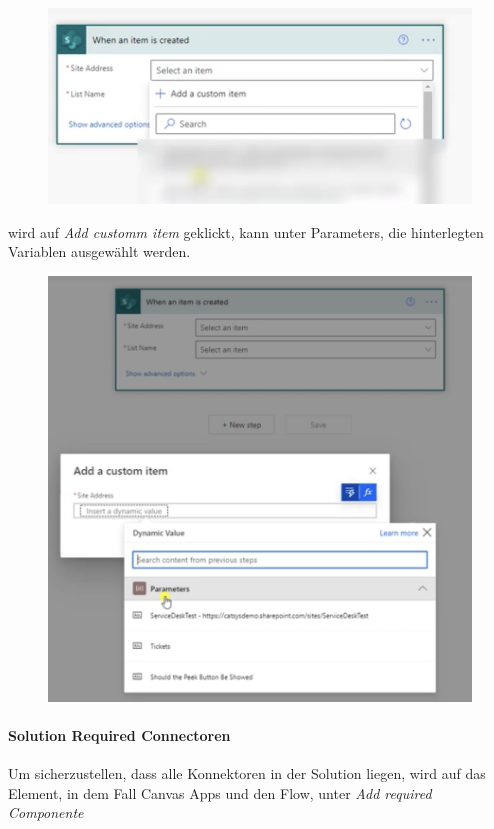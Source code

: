 \begin{figure}[H]
	\centering
	\includegraphics[scale = 0.3]{attachment/chapter_13/Scc057}
\end{figure}

wird auf \textit{Add customm item} geklickt, kann unter Parameters, die hinterlegten Variablen ausgewählt werden.

\begin{figure}[H]
	\centering
	\includegraphics[scale = 0.3]{attachment/chapter_13/Scc059}
\end{figure}

\paragraph{Solution Required Connectoren}
Um sicherzustellen, dass alle Konnektoren in der Solution liegen, wird auf das Element, in dem Fall Canvas Apps und den Flow, unter \textit{Add required Componente}

